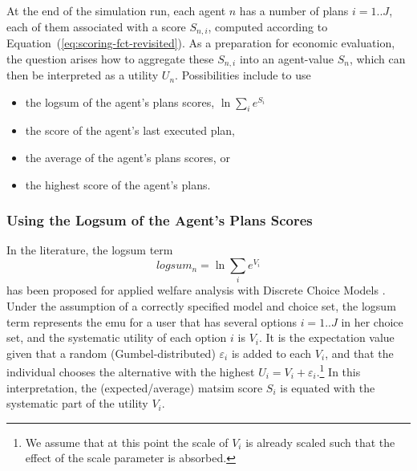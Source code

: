 At the end of the simulation run, each agent $n$ has a number of plans $i=1..J$, each of them associated with a score $S_{n,i}$, computed according to Equation~(\ref{eq:scoring-fct-revisited}).
%
%
As a preparation for economic evaluation, the question arises how to aggregate these $S_{n,i}$ into an agent-value $S_n$, which can then be interpreted as a utility $U_n$.  Possibilities include to use
%
%
\begin{itemize}\styleItemize
\item the logsum of the agent's plans scores, \ie $\ln \sum_i e^{S_i}$
\item the score of the agent's last executed plan, 
\item the average of the agent's plans scores, or
\item the highest score of the agent's plans.
\end{itemize}
%

\subsubsection{Using the Logsum of the Agent's Plans Scores}
\label{ch:economicEval:valuingBehavior:output2Eval:logsum}
In the literature, the logsum term 
\[
logsum_n = \ln \sum_i e^{V_i}
\]
has been proposed for applied welfare analysis with Discrete Choice Models \citep{SmallRosen1981AppliedWelfareEconomics, deJongDalyEtAl2006logsum, KohliDaly2006LogsumEvalPRISM, deJongEtAl2007LogsumTRA}.
%
%
Under the assumption of a 
  correctly specified model and choice set,
the logsum term represents the \gls{emu} for a user that has several options $i=1..J$ in her choice set, and the systematic utility of each option $i$ is $V_i$.
%
It is the expectation value given that a random (Gumbel-distributed) $\varepsilon_i$ is added to each $V_i$, and that the individual chooses the alternative with the highest $U_i = V_i + \varepsilon_i$.\footnote{%
%
We assume that at this point the scale of $V_i$ is already scaled such that the effect of the scale parameter is absorbed.
%
} In this interpretation, the 
(expected/average) \acrshort{matsim} score $S_i$ is equated with the systematic part of the utility $V_i$.



